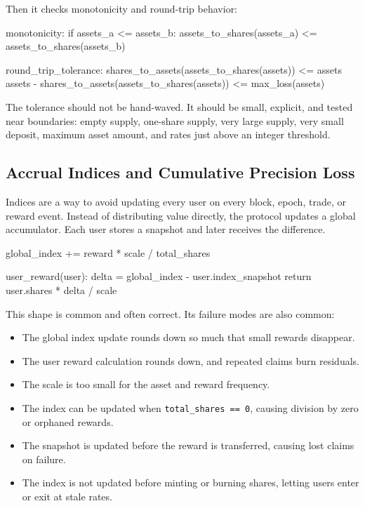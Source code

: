 Then it checks monotonicity and round-trip behavior:

\begin{codeblock}
monotonicity:
    if assets_a <= assets_b:
        assets_to_shares(assets_a) <= assets_to_shares(assets_b)

round_trip_tolerance:
    shares_to_assets(assets_to_shares(assets)) <= assets
    assets - shares_to_assets(assets_to_shares(assets)) <= max_loss(assets)
\end{codeblock}

The tolerance should not be hand-waved. It should be small, explicit, and tested near boundaries: empty supply, one-share supply, very large supply, very small deposit, maximum asset amount, and rates just above an integer threshold.

\subsection{Accrual Indices and Cumulative Precision Loss}

Indices are a way to avoid updating every user on every block, epoch, trade, or reward event. Instead of distributing value directly, the protocol updates a global accumulator. Each user stores a snapshot and later receives the difference.

\begin{codeblock}
global_index += reward * scale / total_shares

user_reward(user):
    delta = global_index - user.index_snapshot
    return user.shares * delta / scale
\end{codeblock}

This shape is common and often correct. Its failure modes are also common:

\begin{itemize}
\item The global index update rounds down so much that small rewards disappear.
\item The user reward calculation rounds down, and repeated claims burn residuals.
\item The scale is too small for the asset and reward frequency.
\item The index can be updated when \texttt{total\_shares == 0}, causing division by zero or orphaned rewards.
\item The snapshot is updated before the reward is transferred, causing lost claims on failure.
\item The index is not updated before minting or burning shares, letting users enter or exit at stale rates.
\end{itemize}

